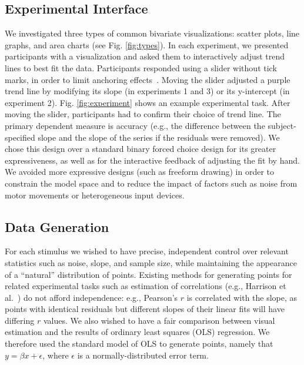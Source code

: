 \documentclass{sigchi}
\begin{document}
\subsection{Experimental Interface}
\typesFig

We investigated three types of common bivariate visualizations: scatter plots, line graphs, and area charts (see Fig. \ref{fig:types}). In each experiment, we presented participants with a visualization and asked them to interactively adjust trend lines to best fit the data.  Participants responded using a slider without tick marks, in order to limit anchoring effects~\cite{matejka2016effect}. Moving the slider adjusted a purple trend line by modifying its slope (in experiments 1 and 3) or its y-intercept (in experiment 2). Fig. \ref{fig:experiment} shows an example experimental task. After moving the slider, participants had to confirm their choice of trend line. The primary dependent measure is accuracy (e.g., the difference between the subject-specified slope and the slope of the series if the residuals were removed). We chose this design over a standard binary forced choice design for its greater expressiveness, as well as for the interactive feedback of adjusting the fit by hand. We avoided more expressive designs (such as freeform drawing) in order to constrain the model space and to reduce the impact of factors such as noise from motor movements or heterogeneous input devices.

\subsection{Data Generation}

\sigmasFig

\trendtypesFig

For each stimulus we wished to have precise, independent control over relevant statistics such as noise, slope, and sample size, while maintaining the appearance of a ``natural'' distribution of points. Existing methods for generating points for related experimental tasks such as estimation of correlations (e.g., Harrison et al.~\cite{harrison2014ranking}) do not afford independence: e.g., Pearson's $r$ is correlated with the slope, as points with identical residuals but different slopes of their linear fits will have differing $r$ values. We also wished to have a fair comparison between visual estimation and the results of ordinary least squares (OLS) regression. We therefore used the standard model of OLS to generate points, namely that $y=\beta x + \epsilon$, where $\epsilon$ is a normally-distributed error term.
\end{document}
